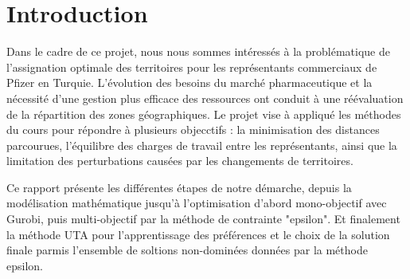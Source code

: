 
\section{Introduction}

Dans le cadre de ce projet, nous nous sommes intéressés à la problématique 
de l'assignation optimale des territoires pour les représentants commerciaux 
de Pfizer en Turquie. L'évolution des besoins du marché pharmaceutique et la 
nécessité d'une gestion plus efficace des ressources ont conduit à une 
réévaluation de la répartition des zones géographiques. Le projet vise 
à appliqué les méthodes du cours pour répondre à plusieurs objecctifs : 
la minimisation des distances parcourues, l'équilibre des charges 
de travail entre les représentants, ainsi que la 
limitation des perturbations causées par les changements de territoires.

Ce rapport présente les différentes étapes de notre démarche, depuis 
la modélisation mathématique jusqu'à l'optimisation d'abord mono-objectif 
avec Gurobi, puis multi-objectif par la méthode de contrainte "epsilon". 
Et finalement la méthode UTA pour l'apprentissage des préférences et le
choix de la solution finale parmis l'ensemble de soltions non-dominées données
par la méthode epsilon.